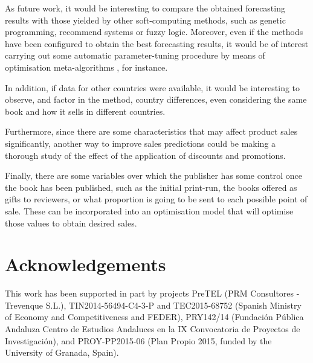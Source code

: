 \documentclass[a4paper,10pt,twocolumn,preprint,3p]{elsarticle}
\begin{document}


As future work, it would be interesting to compare the obtained
forecasting results with those yielded by other soft-computing
methods, such as genetic programming, recommend systems or fuzzy logic. 
Moreover, even if the methods have been configured to obtain the best
forecasting results, it would be of interest carrying out some
automatic parameter-tuning procedure by means of optimisation
meta-algorithms \cite{huang2006ga,Mookiah2013_EA_Tuning,Shen2016_FFly_Tuning},  
for instance. 

In addition, if data for other countries were available, it would be
interesting to observe, and factor in the method, country differences,
even considering the same book and how it sells in different
countries. 

Furthermore, since there are some characteristics that may affect product sales 
significantly, another way to improve sales predictions could be making a 
thorough study of the effect of the application of discounts and promotions. 

Finally, there are some variables over which the publisher has some
control once the book has been published, such as the initial print-run, 
the books offered as gifts to reviewers, or what proportion is going to be sent 
to each possible point of sale. These can be incorporated into an optimisation 
model that will optimise those values to obtain desired sales. 


\section*{Acknowledgements}

This work has been supported in part by projects PreTEL (PRM Consultores - Trevenque S.L.), TIN2014-56494-C4-3-P and TEC2015-68752 (Spanish Ministry of Economy and Competitiveness and FEDER), PRY142/14 (Fundaci{\'o}n P{\'u}blica Andaluza Centro de Estudios Andaluces en la IX Convocatoria de Proyectos de Investigaci{\'o}n), and PROY-PP2015-06 (Plan Propio 2015, funded by the University of Granada, Spain).
\end{document}
